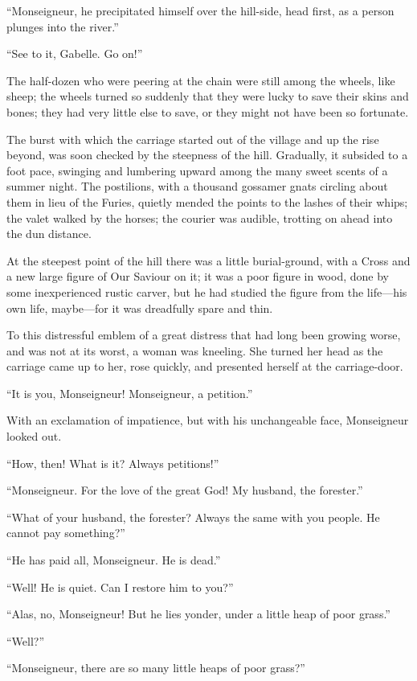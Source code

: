 ``Monseigneur, he precipitated himself over the hill-side, head first,
as a person plunges into the river.''

``See to it, Gabelle.  Go on!''

The half-dozen who were peering at the chain were still among the
wheels, like sheep; the wheels turned so suddenly that they were
lucky to save their skins and bones; they had very little else to
save, or they might not have been so fortunate.

The burst with which the carriage started out of the village and up
the rise beyond, was soon checked by the steepness of the hill.
Gradually, it subsided to a foot pace, swinging and lumbering upward
among the many sweet scents of a summer night.  The postilions, with
a thousand gossamer gnats circling about them in lieu of the Furies,
quietly mended the points to the lashes of their whips; the valet
walked by the horses; the courier was audible, trotting on ahead into
the dun distance.

At the steepest point of the hill there was a little burial-ground,
with a Cross and a new large figure of Our Saviour on it; it was a
poor figure in wood, done by some inexperienced rustic carver, but he
had studied the figure from the life---his own life, maybe---for it was
dreadfully spare and thin.

To this distressful emblem of a great distress that had long been
growing worse, and was not at its worst, a woman was kneeling.
She turned her head as the carriage came up to her, rose quickly,
and presented herself at the carriage-door.

``It is you, Monseigneur!  Monseigneur, a petition.''

With an exclamation of impatience, but with his unchangeable face,
Monseigneur looked out.

``How, then!  What is it?  Always petitions!''

``Monseigneur.  For the love of the great God!  My husband, the forester.''

``What of your husband, the forester?  Always the same with you people.
He cannot pay something?''

``He has paid all, Monseigneur.  He is dead.''

``Well!  He is quiet.  Can I restore him to you?''

``Alas, no, Monseigneur!  But he lies yonder, under a little heap of
poor grass.''

``Well?''

``Monseigneur, there are so many little heaps of poor grass?''

